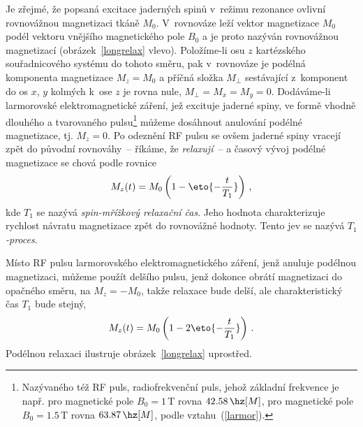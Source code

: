 Je zřejmé, že popsaná excitace jaderných spinů v~režimu rezonance ovlivní
rovnovážnou magnetizaci tkáně $M_{0}$. V~rovnováze leží vektor magnetizace
$M_{0}$ podél vektoru vnějšího magnetického pole $B_{0}$ a je proto nazýván
rovnovážnou magnetizací (obrázek~\ref{longrelax} vlevo). Položíme-li osu $z$
kartézského souřadnicového systému do tohoto směru, pak v~rovnováze je podélná
komponenta magnetizace $M_{z}=M_{0}$ a příčná složka $M_{\perp}$ sestávající
z~komponent do os $x$, $y$ kolmých k~ose $z$ je rovna nule, $M_{\perp} = M_{x}
= M_{y} = 0$.  Dodáváme-li larmorovské elektromagnetické
záření, jež excituje jaderné spiny, ve formě
vhodně dlouhého a tvarovaného pulsu\footnote{Nazývaného též RF puls,
  radiofrekvenční puls, jehož základní frekvence je např. pro magnetické pole
  $B_{0}=1\,\mathrm{T}$ rovna $42.58\,\hz[M]$, pro magnetické pole
  $B_{0}=1.5\,\mathrm{T}$ rovna $63.87\,\hz[M]$, podle vztahu~(\ref{larmor}).}
můžeme dosáhnout anulování podélné magnetizace, tj.  $M_{z}=0$. Po odeznění RF
pulsu se ovšem jaderné spiny vracejí zpět do původní rovnováhy~-- říkáme, že
\emph{relaxují}~-- a časový vývoj podélné magnetizace se chová podle rovnice
\begin{equation}
  M_{z}(t) = M_{0}\left(1-\eto{-\frac{t}{T_{1}}}\right)\,, \label{spinlat}
\end{equation}
kde $T_{1}$ se nazývá \emph{spin-mřížkový relaxační čas}. Jeho hodnota
charakterizuje rychlost návratu magnetizace zpět do rovnovážné hodnoty. Tento
jev se nazývá \emph{$T_{1}$-proces}.

Místo RF pulsu larmorovského elektromagnetického
záření, jenž anuluje podélnou magnetizaci,
můžeme použít delšího pulsu, jenž dokonce obrátí magnetizaci do opačného
směru, na $M_{z} = -M_{0}$, takže relaxace bude delší, ale charakteristický
čas $T_{1}$ bude stejný,
\begin{equation}
  M_{z}(t)=M_{0}\left(1-2\eto{-\frac{t}{T_{1}}}\right)\,. \label{spinlatb}
\end{equation}
Podélnou relaxaci ilustruje obrázek~\ref{longrelax} uprostřed.

